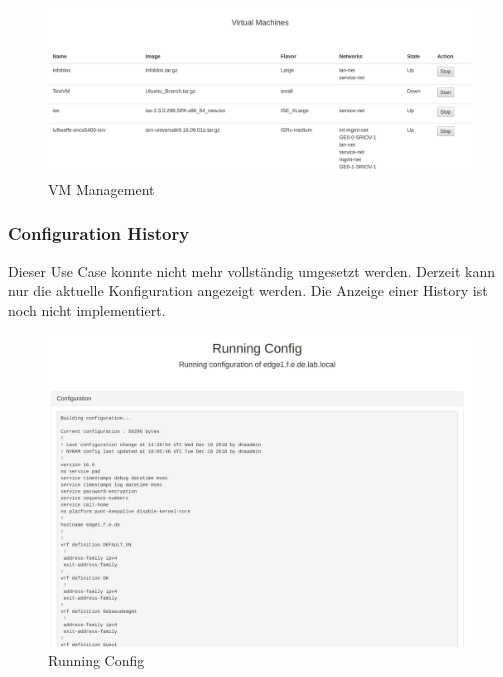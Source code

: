 \begin{figure}[H]
	\centering
	\includegraphics[width=0.8\linewidth]{img/Abstrahierung/vm-management.png}
	\caption{VM Management}
	\label{fig:VM Management}
\end{figure}

\subsubsection{Configuration History}

Dieser Use Case konnte nicht mehr vollständig umgesetzt werden. Derzeit kann nur die aktuelle Konfiguration angezeigt werden. Die Anzeige einer History ist noch nicht implementiert.

\begin{figure}[H]
	\centering
	\includegraphics[width=0.8\linewidth]{img/Abstrahierung/running-config.png}
	\caption{Running Config}
	\label{fig:Running Config}
\end{figure}






